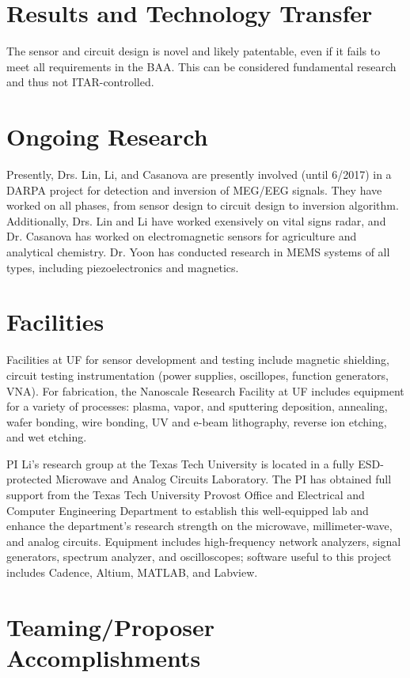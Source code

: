 \section{Results and Technology Transfer}

The sensor and circuit design is novel and likely patentable, even if it fails to meet all requirements in the BAA. This can be considered fundamental research and thus not ITAR-controlled.

\section{Ongoing Research}
Presently, Drs. Lin, Li, and Casanova are presently involved (until 6/2017) in a DARPA project for detection and inversion of MEG/EEG signals. They have worked on all phases, from sensor design to circuit design to inversion algorithm. Additionally, Drs. Lin and Li have worked exensively on vital signs radar, and Dr. Casanova has worked on electromagnetic sensors for agriculture and analytical chemistry. Dr. Yoon has conducted research in MEMS systems of all types, including piezoelectronics and magnetics. 

\section{Facilities}

Facilities at UF for sensor development and testing include magnetic shielding, circuit testing instrumentation (power supplies, oscillopes, function generators, VNA). For fabrication, the Nanoscale Research Facility at UF includes equipment for a variety of processes: plasma, vapor, and sputtering deposition, annealing, wafer bonding, wire bonding, UV and e-beam lithography, reverse ion etching, and wet etching.

PI Li’s research group at the Texas Tech University is located in a fully ESD-protected Microwave and Analog Circuits Laboratory. The PI has obtained full support from the Texas Tech University Provost Office and Electrical and Computer Engineering Department to establish this well-equipped lab and enhance the department’s research strength on the microwave, millimeter-wave, and analog circuits. Equipment includes high-frequency network analyzers, signal generators, spectrum analyzer, and oscilloscopes; software useful to this project includes Cadence, Altium, MATLAB, and Labview.

\section{Teaming/Proposer Accomplishments}

